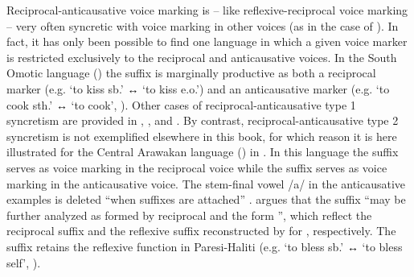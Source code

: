 Reciprocal-anticausative voice marking is -- like reflexive-reciprocal voice marking -- very often syncretic with voice marking in other voices (as in the case of ). In fact, it has only been possible to find one language in which a given voice marker is restricted exclusively to the reciprocal and anticausative voices. In the South Omotic language  () the suffix  is marginally productive as both a reciprocal marker (e.g.  ‘to kiss sb.’ ↔  ‘to kiss e.o.’) and an anticausative marker (e.g.  ‘to cook sth.’ ↔  ‘to cook’, \citealt[148ff.]{petrollino:2016}). Other cases of reciprocal-anticausative type 1 syncretism are provided in , , and . By contrast, reciprocal-anticausative type 2 syncretism is not exemplified elsewhere in this book, for which reason it is here illustrated for the Central Arawakan language  () in . In this language the suffix  serves as voice marking in the reciprocal voice while the suffix  serves as voice marking in the anticausative voice. The stem-final vowel /a/ in the anticausative examples is deleted “when suffixes are attached” \citep[68f.]{brandao:2014}. \cite[259]{brandao:2014} argues that the suffix  “may be further analyzed as formed by reciprocal  and the  form ”, which reflect the reciprocal suffix  and the reflexive suffix  reconstructed by \cite{wise:1990} for , respectively. The suffix  retains the reflexive function in Paresi-Haliti (e.g.  ‘to bless sb.’ ↔  ‘to bless self’, \citealt[251]{brandao:2014}).


